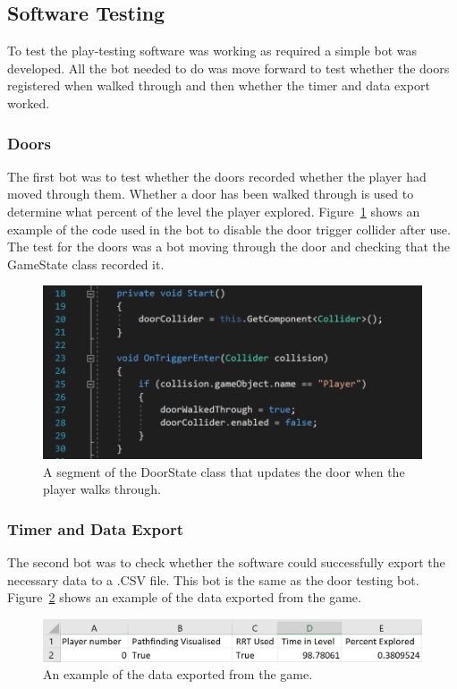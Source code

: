 \documentclass[journal]{IEEEtran}
\begin{document}
	\subsection{Software Testing} \label{softtest}
	To test the play-testing software was working as required a simple bot was developed. All the bot needed to do was move forward to test whether the doors registered when walked through and then whether the timer and data export worked.
	
	\subsubsection{Doors}
	The first bot was to test whether the doors recorded whether the player had moved through them. Whether a door has been walked through is used to determine what percent of the level the player explored. Figure~\ref{image:DoorCode} shows an example of the code used in the bot to disable the door trigger collider after use. The test for the doors was a bot moving through the door and checking that the GameState class recorded it.
	
	\begin{figure}[h]
		\includegraphics[width=1.0\linewidth]{DoorCode.png}
		\caption{A segment of the DoorState class that updates the door when the player walks through.}
		\label{image:DoorCode}
	\end{figure} 
	
	\subsubsection{Timer and Data Export}
	The second bot was to check whether the software could successfully export the necessary data to a .CSV file. This bot is the same as the door testing bot. Figure~\ref{image:ExportData} shows an example of the data exported from the game.  
	
	\begin{figure}[h]
		\includegraphics[width=1.0\linewidth]{ExportData.png}
		\caption{An example of the data exported from the game.}
		\label{image:ExportData}
	\end{figure} 
	
\end{document}
